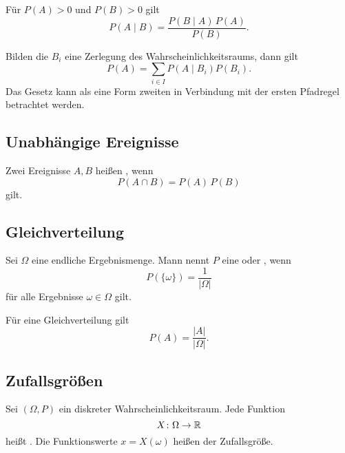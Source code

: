 \minisection{}
Für $P(A)>0$ und $P(B)>0$ gilt%
\begin{equation}
P(A\mid B) = \frac{P(B\mid A)\, P(A)}{P(B)}.
\end{equation}

\minisection{}
Bilden die $B_i$
eine Zerlegung des Wahrscheinlichkeitsraums, dann gilt%
\begin{equation}
P(A) = \sum_{i\in I} P(A\mid B_i)P(B_i).
\end{equation}
Das Gesetz kann als eine Form zweiten in Verbindung mit
der ersten Pfadregel betrachtet werden.


\newpage
\subsection{Unabhängige Ereignisse}
\begin{definition}\mbox{}\newline%
Zwei Ereignisse $A,B$ heißen , wenn%
\begin{equation}
P(A\cap B) = P(A)\, P(B)
\end{equation}
gilt.
\end{definition}

\subsection{Gleichverteilung}
\begin{definition}%
\mbox{}\newline{}
Sei $\Omega$ eine endliche Ergebnismenge. Mann nennt $P$ eine
 oder , wenn%
\begin{equation}
P(\{\omega\}) = \frac{1}{|\Omega|}
\end{equation}
für alle Ergebnisse $\omega\in\Omega$ gilt.
\end{definition}

\noindent
Für eine Gleichverteilung gilt
\begin{equation}
P(A) = \frac{|A|}{|\Omega|}.
\end{equation}

\subsection{Zufallsgrößen}
\begin{definition}[Zufallsgröße]\mbox{}\newline
Sei $(\Omega,P)$ ein diskreter Wahrscheinlichkeitsraum. Jede Funktion%
\begin{equation}
X\colon\Omega\to\mathbb R
\end{equation}
heißt . Die Funktionswerte $x=X(\omega)$ heißen
 der Zufallsgröße.
\end{definition}


